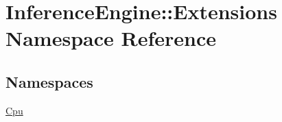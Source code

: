 \hypertarget{namespaceInferenceEngine_1_1Extensions}{}\section{Inference\+Engine\+:\+:Extensions Namespace Reference}
\label{namespaceInferenceEngine_1_1Extensions}
\subsection*{Namespaces}
\begin{DoxyCompactItemize}
\item 
 \hyperlink{namespaceInferenceEngine_1_1Extensions_1_1Cpu}{Cpu}
\end{DoxyCompactItemize}
